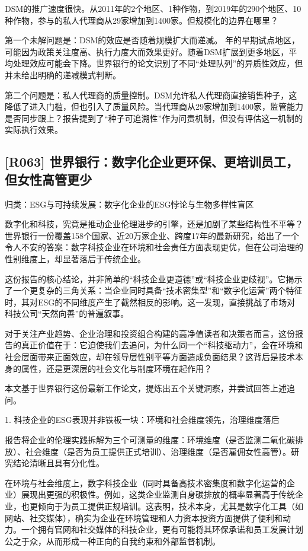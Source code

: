 \documentclass[11pt]{ctexart}
\begin{document}
DSM的推广速度很快。从2011年的2个地区、1种作物，到2019年的290个地区、10种作物，参与的私人代理商从29家增加到1400家。但规模化的边界在哪里？

第一个未解问题是：DSM的效应是否随着规模扩大而递减。 年的早期试点地区，可能因为政策关注度高、执行力度大而效果更好。随着DSM扩展到更多地区，平均处理效应可能会下降。世界银行的论文识别了不同“处理队列”的异质性效应，但并未给出明确的递减模式判断。

第二个问题是：私人代理商的质量控制。DSM允许私人代理商直接销售种子，这降低了进入门槛，但也引入了质量风险。当代理商从29家增加到1400家，监管能力是否同步跟上？报告提到了“种子可追溯性”作为问责机制，但没有评估这一机制的实际执行效果。

\subsection{[R063] 世界银行：数字化企业更环保、更培训员工，但女性高管更少}
{\small\color{refgray}归类：ESG与可持续发展：数字化企业的ESG悖论与生物多样性盲区}

数字化和科技，究竟是推动企业伦理进步的引擎，还是加剧了某些结构性不平等？世界银行一份覆盖158个国家、近20万家企业、跨度17年的最新研究，给出了一个令人不安的答案：数字科技企业在环境和社会责任方面表现更优，但在公司治理的性别维度上，却显著落后于传统企业。

这份报告的核心结论，并非简单的“科技企业更道德”或“科技企业更歧视”。它揭示了一个更复杂的三角关系：当企业同时具备“技术密集型”和“数字化运营”两个特征时，其对ESG的不同维度产生了截然相反的影响。这一发现，直接挑战了市场对科技公司“天然向善”的普遍叙事。

对于关注产业趋势、企业治理和投资组合构建的高净值读者和决策者而言，这份报告的真正价值在于：它迫使我们去追问，为什么同一个“科技驱动力”，会在环境和社会层面带来正面效应，却在领导层性别平等方面造成负面结果？这背后是技术本身的属性，还是更深层的社会文化与制度环境在起作用？

本文基于世界银行这份最新工作论文，提炼出五个关键洞察，并尝试回答上述追问。

1. 科技企业的ESG表现并非铁板一块：环境和社会维度领先，治理维度落后

报告将企业的伦理实践拆解为三个可测量的维度：环境维度（是否监测二氧化碳排放）、社会维度（是否为员工提供正式培训）、治理维度（是否雇佣女性高管）。研究结论清晰且具有分化性。

在环境与社会维度上，数字科技企业（同时具备高技术密集度和数字化运营的企业）展现出更强的积极性。例如，这类企业监测自身碳排放的概率显著高于传统企业，也更倾向于为员工提供正规培训。这表明，技术本身，尤其是数字化工具（如网站、社交媒体），确实为企业在环境管理和人力资本投资方面提供了便利和动力。一个拥有官网和社交媒体的科技企业，更有可能将其环保承诺和员工发展计划公之于众，从而形成一种正向的自我约束和外部监督机制。
\end{document}
